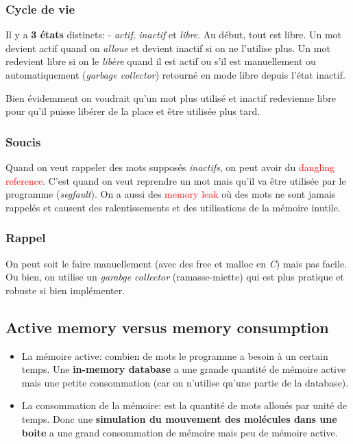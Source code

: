 \documentclass{report}
\begin{document}
\subsubsection{Cycle de vie}
Il y a \textbf{3 états} distincts: - \textit{actif}, \textit{inactif} et \textit{libre}. Au début, tout est libre. Un mot devient actif quand on \textit{alloue} et devient inactif si on ne l'utilise plus. Un mot redevient libre si on le \textit{libère} quand il est actif ou s'il est manuellement ou automatiquement (\textit{garbage collector}) retourné en mode libre depuis l'état inactif.\par 
Bien évidemment on voudrait qu'un mot plus utilisé et inactif redevienne libre pour qu'il puisse libérer de la place et être utilisée plus tard.

\subsubsection{Soucis}
Quand on veut rappeler des mots supposés \textit{inactifs}, on peut avoir du \textcolor{red}{dangling reference}. C'est quand on veut reprendre un mot mais qu'il va être utilisée par le programme (\textit{segfault}). On a aussi des \textcolor{red}{memory leak} où des mots ne sont jamais rappelés et causent des ralentissements et des utilisations de la mémoire inutile.

\subsubsection{Rappel}
On peut soit le faire manuellement (avec des free et malloc en \textit{C}) mais pas facile. Ou bien, on utilise un \textit{garabge collector} (ramasse-miette) qui est plus pratique et robuste si bien implémenter.

\subsection{Active memory versus memory consumption}
\begin{itemize}
\item La mémoire active: combien de mots le programme a besoin à un certain temps. Une \textbf{in-memory database} a une grande quantité de mémoire active mais une petite consommation (car on n'utilise qu'une partie de la database).
\item La consommation de la mémoire: est la quantité de mots alloués par unité de temps. Donc une \textbf{simulation du mouvement des molécules dans une boite} a une grand consommation de mémoire mais peu de mémoire active.
\end{itemize}
\end{document}
